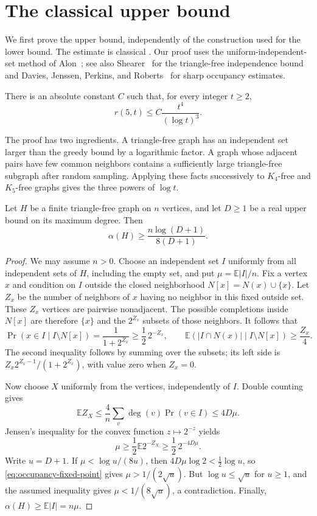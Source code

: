 \section{The classical upper bound}\label{sec:upper}

We first prove the upper bound, independently of the construction used
for the lower bound.  The estimate is classical
\cite{AKS1980}.  Our proof uses the uniform-independent-set method of
Alon~\cite{Alon1996}; see also Shearer~\cite{Shearer1983} for the
triangle-free independence bound and Davies, Jenssen, Perkins, and
Roberts~\cite{DJPR2018} for sharp occupancy estimates.

\begin{theorem}\label{thm:upper}
There is an absolute constant $C$ such that, for every integer $t\ge2$,
\[
 r(5,t)\le C\frac{t^4}{(\log t)^3}.
\]
\end{theorem}

The proof has two ingredients.  A triangle-free graph has an independent
set larger than the greedy bound by a logarithmic factor.  A graph whose
adjacent pairs have few common neighbors contains a sufficiently large
triangle-free subgraph after random sampling.  Applying these facts
successively to $K_4$-free and $K_5$-free graphs gives the three powers of
$\log t$.

\begin{lemma}\label{lem:occupancy}
Let $H$ be a finite triangle-free graph on $n$ vertices, and let $D\ge1$
be a real upper bound on its maximum degree.  Then
\[
 \alpha(H)\ge\frac{n\log(D+1)}{8(D+1)}.
\]
\end{lemma}

\begin{proof}
We may assume $n>0$.  Choose an independent set $I$ uniformly from all
independent sets of $H$, including the empty set, and put
$\mu=\mathbb E|I|/n$.  Fix a vertex $x$ and condition on $I$ outside the
closed neighborhood $N[x]=N(x)\cup\{x\}$.  Let $Z_x$ be the number of
neighbors of $x$ having no neighbor in this fixed outside set.  These
$Z_x$ vertices are pairwise nonadjacent.  The possible completions inside
$N[x]$ are therefore $\{x\}$ and the $2^{Z_x}$ subsets of those neighbors.
It follows that
\[
 \Pr(x\in I\mid I\setminus N[x])
 =\frac1{1+2^{Z_x}}\ge\frac12\,2^{-Z_x},
 \qquad
 \mathbb E(|I\cap N(x)|\mid I\setminus N[x])\ge\frac{Z_x}{4}.
\]
The second inequality follows by summing over the subsets; its left side
is $Z_x2^{Z_x-1}/(1+2^{Z_x})$, with value zero when $Z_x=0$.

Now choose $X$ uniformly from the vertices, independently of $I$.
Double counting gives
\[
 \mathbb E Z_X
 \le\frac4n\sum_v\deg(v)\Pr(v\in I)\le4D\mu.
\]
Jensen's inequality for the convex function $z\mapsto2^{-z}$ yields
\begin{equation}\label{eq:occupancy-fixed-point}
 \mu\ge\frac12\mathbb E2^{-Z_X}
 \ge\frac12\,2^{-4D\mu}.
\end{equation}
Write $u=D+1$.  If $\mu<\log u/(8u)$, then
$4D\mu\log2<\tfrac12\log u$, so
\eqref{eq:occupancy-fixed-point} gives $\mu>1/(2\sqrt u)$.
But $\log u\le\sqrt u$ for $u\ge1$, and the assumed inequality gives
$\mu<1/(8\sqrt u)$, a contradiction.
Finally, $\alpha(H)\ge\mathbb E|I|=n\mu$.
\end{proof}

